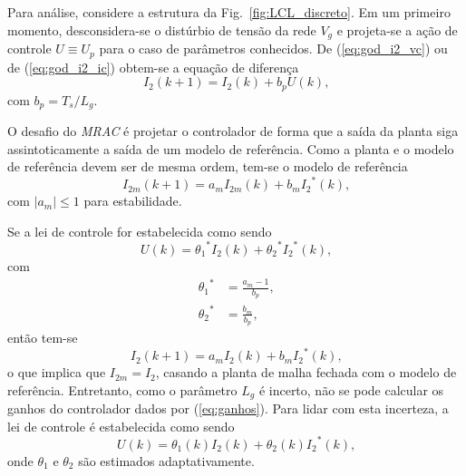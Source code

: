   Para análise, considere a estrutura da Fig.~\ref{fig:LCL_discreto}. Em um primeiro momento, desconsidera-se o distúrbio de tensão da rede $V_g$ e projeta-se a ação de controle $U \equiv U_p$ para o caso de parâmetros conhecidos. %
  De (\ref{eq:god_i2_vc}) ou de (\ref{eq:god_i2_ic}) obtem-se a equação de diferença
  \begin{equation}
    I_2 (k + 1) = I_2 (k) + b_p U (k) \text{,}
    \label{eq:diferenca}
  \end{equation}
  com $b_p = T_s / L_g$.

  O desafio do \emph{MRAC} é projetar o controlador de forma que a saída da planta siga assintoticamente a saída de um modelo de referência. Como a planta e o modelo de referência devem ser de mesma ordem, tem-se o modelo de referência
  \begin{equation}
    I_{2m}(k + 1) = a_m I_{2m}(k) + b_m {I_2}^* (k) \text{,}
    \label{eq:modelo_referencia}
  \end{equation}
  com $| a_m | \le 1$ para estabilidade.

  Se a lei de controle for estabelecida como sendo
  \begin{equation}
    U (k) = {\theta_1}^* I_2 (k) + {\theta_2}^* {I_2}^* (k) \text{,}
  \end{equation}
  com
  \begin{equation}
    \begin{split}
      {\theta_1}^* & = \frac{a_m - 1}{b_p} \text{,}\\
      {\theta_2}^* & = \frac{b_m}{b_p} \text{,}
    \end{split}
    \label{eq:ganhos}
  \end{equation}
  então tem-se
  \begin{equation}
    I_2 (k + 1) = a_m I_2 (k) + b_m {I_2}^* (k) \text{,}
  \end{equation}
  o que implica que $I_{2m} = I_2$, casando a planta de malha fechada com o modelo de referência. Entretanto, como o parâmetro $L_g$ é incerto, não se pode calcular os ganhos do controlador dados por (\ref{eq:ganhos}). Para lidar com esta incerteza, a lei de controle é estabelecida como sendo
  \begin{equation}
    U (k) = \theta_1 (k) I_2 (k) + \theta_2 (k) {I_2}^* (k) \text{,}
    \label{eq:controle_incerteza}
  \end{equation}
  onde $\theta_1$ e $\theta_2$ são estimados adaptativamente.

